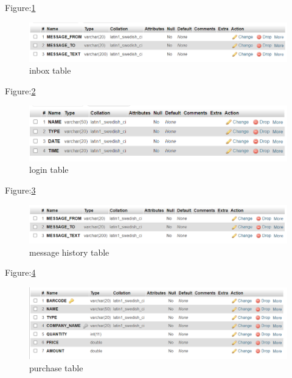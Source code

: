 \documentclass[12pt, letter paper]{report}
\begin{document}
\begin{center}
	Figure:\ref{fig:inbox.png}
	\begin{figure}[h]
		\centering
		\includegraphics[width=1\textwidth]{inbox.png}
		\caption{inbox table}
		\label{fig:inbox.png}
	\end{figure}
\end{center}

\begin{center}
	Figure:\ref{fig:login.png}
	\begin{figure}[h]
		\centering
		\includegraphics[width=1\textwidth]{login.png}
		\caption{login table}
		\label{fig:login.png}
	\end{figure}
\end{center}
\newpage
\begin{center}
	Figure:\ref{fig:messagehist}
	\begin{figure}[h]
		\centering
		\includegraphics[width=1\textwidth]{messagehist.png}
		\caption{message history table}
		\label{fig:messagehist}
	\end{figure}
\end{center}

\begin{center}
	Figure:\ref{fig:purchase.png}
	\begin{figure}[h]
		\centering
		\includegraphics[width=1\textwidth]{purchase.png}
		\caption{purchase table}
		\label{fig:purchase.png}
	\end{figure}
\end{center}
\end{document}
